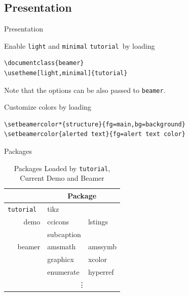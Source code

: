 \documentclass{beamer}%
\newcommand{\theme}{\texttt{tutorial}}
\begin{document}
\subsection{Presentation}
\begin{frame}[fragile]{Presentation}
\begin{block}{Enable \texttt{light} and \texttt{minimal} \theme\ by loading}
\vspace*{-\bigskipamount}
\begin{verbatim}
\documentclass{beamer}
\usetheme[light,minimal]{tutorial}
\end{verbatim}
\vspace*{-\medskipamount}
Note that the options can be also passed to \texttt{beamer}.
\end{block}

\begin{block}{Customize colors by loading}
\vspace*{-\bigskipamount}
\begin{verbatim}
\setbeamercolor*{structure}{fg=main,bg=background}
\setbeamercolor{alerted text}{fg=alert text color}
\end{verbatim}
\vspace*{-\medskipamount}
\end{block}
\end{frame}
\begin{frame}{Packages}
\begin{table}
\ttfamily%
\begin{tabular}{rll}
	\hline\hline
	& \multicolumn{2}{c}{\textsf{Package}}\\
	\hline
	\theme\	& tikz	&\\
	\textsf{demo}
		& ccicons	& lstings\\
		& subcaption&\\
	beamer
		& amsmath	& amssymb\\
		& graphicx	& xcolor\\
		& enumerate	& hyperref\\
		& \multicolumn{2}{c}{\vdots}\\
	\hline\hline
\end{tabular}
\caption{Packages Loaded by \theme, Current Demo and Beamer}
\end{table}
\end{frame}
\end{document}
